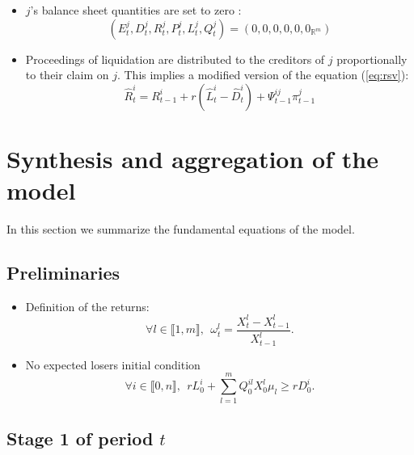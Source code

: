 \documentclass{article}
\newcommand{\wh}{\widehat}
\begin{document}
\begin{enumerate}
\begin{itemize}
        \item $j$'s balance sheet quantities are set to zero :
        $$(E_t^j, D_t^j, R_t^j, P_t^j, L_t^j, Q_t^j) = (0, 0, 0, 0, 0, 0_{\mathbb{R}^m}) $$
        
        \item Proceedings of liquidation are distributed to the creditors of $j$ proportionally to their claim on $j$. This implies a modified version of the equation (\ref{eq:rsv}): 
        $$ \widehat{R}_t^i = R_{t-1}^i + r (\wh L_t^i - \wh D_t^i)+ \Psi_{t-1}^{ij} \pi_{t-1}^j$$


    \end{itemize}

 \end{enumerate}
 

\section{Synthesis and aggregation of the model}

In this section we summarize the fundamental equations of the model. 

\subsection{Preliminaries}

\begin{itemize}
    \item Definition of the returns:
    $$\forall l \in \llbracket 1, m \rrbracket,~~\omega_t^l = \frac{X_t^l - X_{t-1}^l}{X_{t-1}^l}.$$
    \item No expected losers initial condition
    $$\forall i \in \llbracket 0, n \rrbracket,~~rL_0^i + \sum_{l=1}^{m} Q_0^{il} X_0^l\mu_l \geq rD_0^i.$$
\end{itemize}


\subsection{Stage 1 of period $t$}
\end{document}
